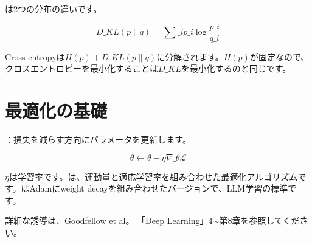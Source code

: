 は2つの分布の違いです。

\[
D\_{KL}(p \| q) = \sum\_i p\_i \log \frac{p\_i}{q\_i}
\]

Cross-entropyは$H(p) + D\_{KL}(p \| q)$に分解されます。$H(p)$が固定なので、クロスエントロピーを最小化することは$D\_{KL}$を最小化するのと同じです。

\section{最適化の基礎}

：損失を減らす方向にパラメータを更新します。

\[
\theta \leftarrow \theta - \eta \nabla\_\theta \mathcal{L}
\]

$\eta$は学習率です。は、運動量と適応学習率を組み合わせた最適化アルゴリズムです。はAdamにweight decayを組み合わせたバージョンで、LLM学習の標準です。

詳細な誘導は、Goodfellow et al。 「Deep Learning」4$\sim$第8章を参照してください。
